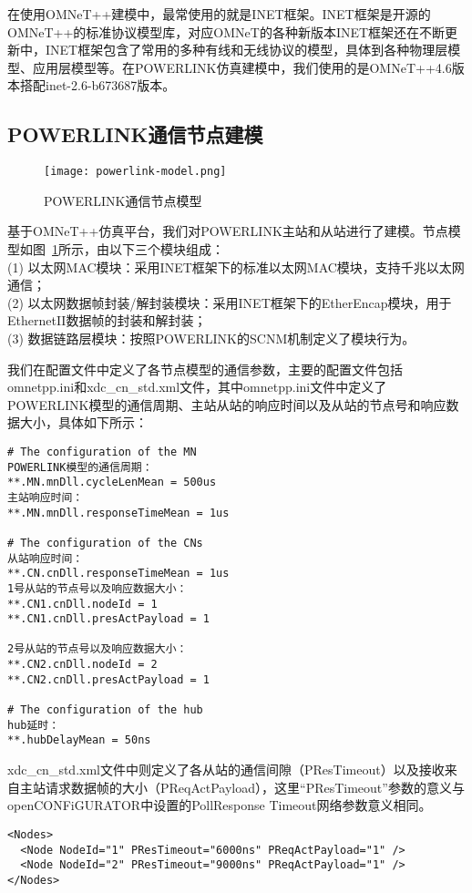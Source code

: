 在使用OMNeT++建模中，最常使用的就是INET框架。INET框架是开源的OMNeT++的标准协议模型库，对应OMNeT的各种新版本INET框架还在不断更新中，INET框架包含了常用的多种有线和无线协议的模型，具体到各种物理层模型、应用层模型等。在POWERLINK仿真建模中，我们使用的是OMNeT++4.6版本搭配inet-2.6-b673687版本。

\subsection{POWERLINK通信节点建模}

\begin{figure}[!htb]
  \centering
  \texttt{[image: powerlink-model.png]}
  \caption{POWERLINK通信节点模型}
  \label{fig:powerlink-model}
\end{figure}
基于OMNeT++仿真平台，我们对POWERLINK主站和从站进行了建模。节点模型如图~\ref{fig:powerlink-model}所示，由以下三个模块组成：\\
(1) 以太网MAC模块：采用INET框架下的标准以太网MAC模块，支持千兆以太网通信；\\
(2) 以太网数据帧封装/解封装模块：采用INET框架下的EtherEncap模块，用于EthernetII数据帧的封装和解封装；\\
(3) 数据链路层模块：按照POWERLINK的SCNM机制定义了模块行为。

我们在配置文件中定义了各节点模型的通信参数，主要的配置文件包括omnetpp.ini和xdc\_cn\_std.xml文件，其中omnetpp.ini文件中定义了POWERLINK模型的通信周期、主站从站的响应时间以及从站的节点号和响应数据大小，具体如下所示：

\begin{lstlisting}
# The configuration of the MN
POWERLINK模型的通信周期：
**.MN.mnDll.cycleLenMean = 500us
主站响应时间：
**.MN.mnDll.responseTimeMean = 1us

# The configuration of the CNs
从站响应时间：
**.CN.cnDll.responseTimeMean = 1us
1号从站的节点号以及响应数据大小：
**.CN1.cnDll.nodeId = 1
**.CN1.cnDll.presActPayload = 1

2号从站的节点号以及响应数据大小：
**.CN2.cnDll.nodeId = 2
**.CN2.cnDll.presActPayload = 1

# The configuration of the hub
hub延时：
**.hubDelayMean = 50ns
\end{lstlisting}


xdc\_cn\_std.xml文件中则定义了各从站的通信间隙（PResTimeout）以及接收来自主站请求数据帧的大小（PReqActPayload），这里“PResTimeout”参数的意义与openCONFiGURATOR中设置的PollResponse Timeout网络参数意义相同。
\begin{lstlisting}
<Nodes>
  <Node NodeId="1" PResTimeout="6000ns" PReqActPayload="1" />
  <Node NodeId="2" PResTimeout="9000ns" PReqActPayload="1" />
</Nodes>
\end{lstlisting}



